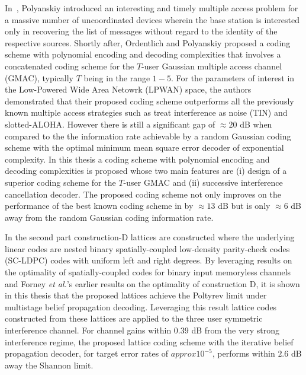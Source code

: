 	\indent In~\cite{polyanskiy2017perspective}, Polyanskiy introduced an interesting and timely multiple access problem for a massive number of uncoordinated devices wherein the base station is interested only in recovering the list of messages without regard to the identity of the respective sources. Shortly after, Ordentlich and Polyanskiy\cite{ordentlich2017low} proposed a coding scheme with polynomial encoding and decoding complexities that involves a concatenated coding scheme for the $T$-user Gaussian multiple access channel (GMAC), typically $T$ being in the range $1-5$. For the parameters of interest in the Low-Powered Wide Area Netowrk (LPWAN) space, the authors \cite{ordentlich2017low} demonstrated that their proposed coding scheme outperforms all the previously known multiple access strategies such as treat interference as noise (TIN) and slotted-ALOHA. However there is still a significant gap of $\approx 20$ dB when compared to the the information rate achievable by a random Gaussian coding scheme with the optimal minimum mean square error decoder of exponential complexity. In this thesis a coding scheme with polynomial encoding and decoding complexities is proposed whose two main features are (i) design of a superior coding scheme for the $T$-user GMAC and (ii) successive interference cancellation decoder. The proposed coding scheme not only improves on the performance of the best known coding scheme in \cite{ordentlich2017low} by $\approx 13$ dB but is only $\approx 6$ dB away from the random Gaussian coding information rate.

\indent In the second part construction-D lattices are constructed where the underlying linear codes are nested binary spatially-coupled low-density parity-check codes (SC-LDPC) codes with uniform left and right degrees. By leveraging results on the optimality of spatially-coupled codes for binary input memoryless channels and Forney {\em et al.}'s earlier results on the optimality of construction D, it is shown in this thesis that the proposed lattices achieve the Poltyrev limit under multistage belief propagation decoding. Leveraging this result lattice codes constructed from these lattices are applied to the three user symmetric interference channel. For channel gains within 0.39 dB from the very strong interference regime, the proposed lattice coding scheme with the iterative belief propagation decoder, for target error rates of $approx 10^{-5}$, performs within $2.6$ dB away the Shannon limit.

